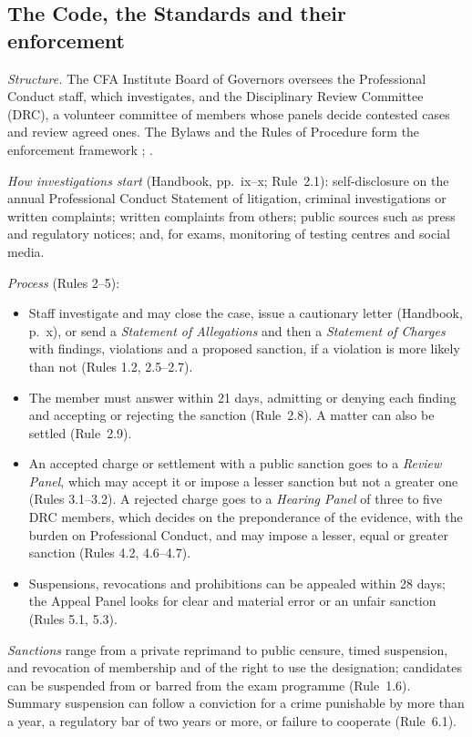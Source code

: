 \subsection{The Code, the Standards and their enforcement}

\begin{qfdefinition}\label{def:professional-conduct-programme}
 \emph{Structure.} The CFA Institute Board of Governors oversees the Professional Conduct staff, which investigates, and the Disciplinary Review Committee (DRC), a volunteer committee of members whose panels decide contested cases and review agreed ones. The Bylaws and the Rules of Procedure form the enforcement framework \citep[p.~ix]{standards-practice-handbook-2024}; \citep[Rules 1.1--1.2]{conduct-rules-of-procedure-2022}.

\emph{How investigations start} (Handbook, pp.~ix--x; Rule~2.1): self-disclosure on the annual Professional Conduct Statement of litigation, criminal investigations or written complaints; written complaints from others; public sources such as press and regulatory notices; and, for exams, monitoring of testing centres and social media.

\emph{Process} (Rules 2--5):
\begin{itemize}
\item Staff investigate and may close the case, issue a cautionary letter (Handbook, p.~x), or send a \emph{Statement of Allegations} and then a \emph{Statement of Charges} with findings, violations and a proposed sanction, if a violation is more likely than not (Rules 1.2, 2.5--2.7).
\item The member must answer within 21 days, admitting or denying each finding and accepting or rejecting the sanction (Rule~2.8). A matter can also be settled (Rule~2.9).
\item An accepted charge or settlement with a public sanction goes to a \emph{Review Panel}, which may accept it or impose a lesser sanction but not a greater one (Rules 3.1--3.2). A rejected charge goes to a \emph{Hearing Panel} of three to five DRC members, which decides on the preponderance of the evidence, with the burden on Professional Conduct, and may impose a lesser, equal or greater sanction (Rules 4.2, 4.6--4.7).
\item Suspensions, revocations and prohibitions can be appealed within 28 days; the Appeal Panel looks for clear and material error or an unfair sanction (Rules 5.1, 5.3).
\end{itemize}
\emph{Sanctions} range from a private reprimand to public censure, timed suspension, and revocation of membership and of the right to use the designation; candidates can be suspended from or barred from the exam programme (Rule~1.6). Summary suspension can follow a conviction for a crime punishable by more than a year, a regulatory bar of two years or more, or failure to cooperate (Rule~6.1).


\end{qfdefinition}
